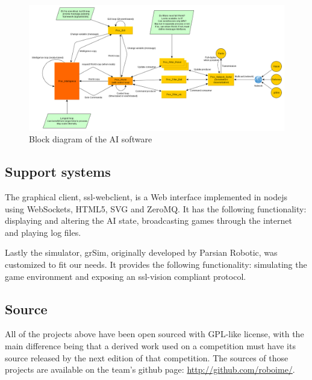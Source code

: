 \begin{figure}[thpb]
     \centering
     \includegraphics[width=15cm]{img/software-model.png}
     \caption{Block diagram of the AI software}
     \label{fluxogramSoftware}
\end{figure}

\subsection{Support systems}

The graphical client, ssl-webclient, is a Web interface implemented in nodejs using WebSockets, HTML5, SVG and ZeroMQ.
It has the following functionality: displaying and altering the AI state, broadcasting games through the internet and playing log files.

Lastly the simulator, grSim, originally developed by Parsian Robotic, was customized to fit our needs.
It provides the following functionality: simulating the game environment and exposing an ssl-vision compliant protocol.

\subsection{Source}

All of the projects above have been open sourced with GPL-like license, with the main difference being that a derived work used on a competition must have its source released by the next edition of that competition. The sources of those projects are available on the team's github page: \url{http://github.com/roboime/}.
